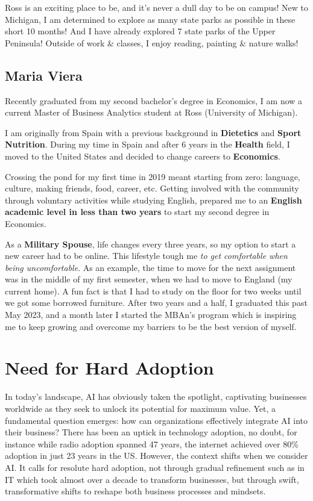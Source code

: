 \documentclass[
]{article}
\begin{document}
Ross is an exciting place to be, and it's never a dull day to be on campus! New to Michigan, I am determined to explore as many state parks as possible in these short 10 months! And I have already explored 7 state parks of the Upper Peninsula! Outside of work \& classes, I enjoy reading, painting \& nature walks!

\hypertarget{maria-viera}{%
\subsection{Maria Viera}\label{maria-viera}}

Recently graduated from my second bachelor's degree in Economics, I am now a current Master of Business Analytics student at Ross (University of Michigan).

I am originally from Spain with a previous background in \textbf{Dietetics} and \textbf{Sport Nutrition}. During my time in Spain and after 6 years in the \textbf{Health} field, I moved to the United States and decided to change careers to \textbf{Economics}.

Crossing the pond for my first time in 2019 meant starting from zero: language, culture, making friends, food, career, etc. Getting involved with the community through voluntary activities while studying English, prepared me to an \textbf{English academic level in less than two years} to start my second degree in Economics.

As a \textbf{Military Spouse}, life changes every three years, so my option to start a new career had to be online. This lifestyle tough me \emph{to get comfortable when being uncomfortable}. As an example, the time to move for the next assignment was in the middle of my first semester, when we had to move to England (my current home). A fun fact is that I had to study on the floor for two weeks until we got some borrowed furniture. After two years and a half, I graduated this past May 2023, and a month later I started the MBAn's program which is inspiring me to keep growing and overcome my barriers to be the best version of myself.

\hypertarget{need-for-hard-adoption}{%
\section{Need for Hard Adoption}\label{need-for-hard-adoption}}

In today's landscape, AI has obviously taken the spotlight, captivating businesses worldwide as they seek to unlock its potential for maximum value. Yet, a fundamental question emerges: how can organizations effectively integrate AI into their business? There has been an uptick in technology adoption, no doubt, for instance while radio adoption spanned 47 years, the internet achieved over 80\% adoption in just 23 years in the US. However, the context shifts when we consider AI. It calls for resolute hard adoption, not through gradual refinement such as in IT which took almost over a decade to transform businesses, but through swift, transformative shifts to reshape both business processes and mindsets.
\end{document}
